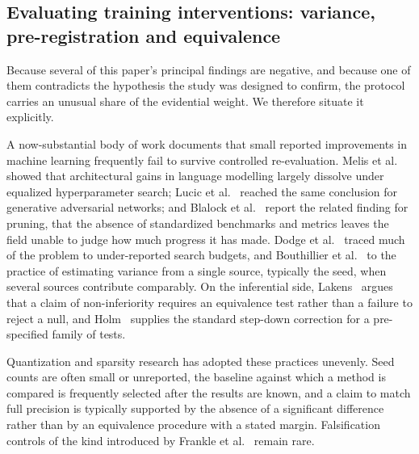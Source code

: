 \documentclass[final,5p,times,twocolumn]{elsarticle}
\theoremstyle{remark}
\begin{document}
\subsection{Evaluating training interventions: variance, pre-registration and
equivalence}
\label{sec:rel-method}

Because several of this paper's principal findings are negative, and because
one of them contradicts the hypothesis the study was designed to confirm, the
protocol carries an unusual share of the evidential weight. We therefore
situate it explicitly.

A now-substantial body of work documents that small reported improvements in
machine learning frequently fail to survive controlled re-evaluation.
Melis et al.~\cite{melis2018} showed that architectural gains in language modelling largely
dissolve under equalized hyperparameter search; Lucic et al.~\cite{lucic2018} reached the
same conclusion for generative adversarial networks; and Blalock et al.~\cite{blalock2020}
report the related finding for pruning, that the absence of standardized
benchmarks and metrics leaves the field unable to judge how much progress it
has made. Dodge et al.~\cite{dodge2019} traced much of the
problem to under-reported search budgets, and Bouthillier et al.~\cite{bouthillier2021} to the
practice of estimating variance from a single source, typically the seed, when
several sources contribute comparably. On the inferential side,
Lakens~\cite{lakens2017} argues that a claim of non-inferiority requires an
equivalence test rather than a failure to reject a null, and
Holm~\cite{holm1979} supplies the standard step-down correction for a
pre-specified family of tests.

Quantization and sparsity research has adopted these practices unevenly.
Seed counts are often small or unreported, the baseline against which a method
is compared is frequently selected after the results are known, and
a claim to match full precision is typically supported by
the absence of a significant difference rather than by an equivalence
procedure with a stated margin. Falsification controls of the kind introduced
by Frankle et al.~\cite{frankle2021} remain rare.
\end{document}
